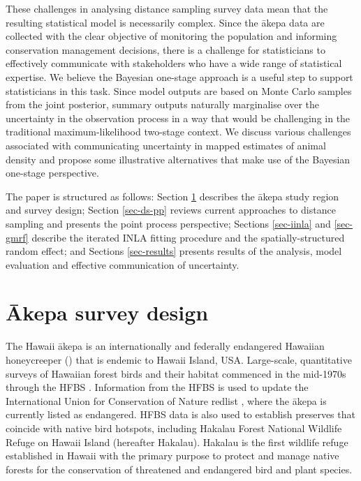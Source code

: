 \documentclass{statsoc}
\newcommand{\akepa}{\textquotesingle\={a}kepa}  %
\newcommand{\Akepa}{\textquotesingle\={A}kepa}  %
\newcommand{\hawaii}{Hawai\textquotesingle i}   %
\begin{document}
These challenges in analysing distance sampling survey data mean that the resulting statistical model is necessarily complex. Since the \akepa{} data are collected with the clear objective of monitoring the population and informing conservation management decisions, there is a challenge for statisticians to effectively communicate with stakeholders who have a wide range of statistical expertise. We believe the Bayesian one-stage approach is a useful step to support statisticians in this task.  Since model outputs are based on Monte Carlo samples from the joint posterior, summary outputs naturally marginalise over the uncertainty in the observation process in a way that would be challenging in the traditional maximum-likelihood two-stage context.  We discuss various challenges associated with communicating uncertainty in mapped estimates of animal density and propose some illustrative alternatives that make use of the Bayesian one-stage perspective.

The paper is structured as follows:  Section \ref{sec-study-design} describes the \akepa{} study region and survey design; Section \ref{sec-ds-pp} reviews current approaches to distance sampling and presents the point process perspective; Sections \ref{sec-iinla} and \ref{sec-gmrf} describe the iterated INLA fitting procedure and the spatially-structured random effect; and Sections \ref{sec-results} presents results of the analysis, model evaluation and effective communication of uncertainty.


\section{\Akepa{} survey design}
\label{sec-study-design}

The \hawaii{} \akepa{} is an internationally and federally endangered Hawaiian honeycreeper (\citealp{usfws_akepa_1970, birdlife_akepa_2016}) that is endemic to \hawaii{} Island, USA.  Large-scale, quantitative surveys of Hawaiian forest birds and their habitat commenced in the mid-1970s through the HFBS \citep{scott_HFBS_1986}. Information from the HFBS is used to update the International Union for Conservation of Nature redlist \citep{iucn_redlist_2022}, where the \akepa{} is currently listed as endangered. HFBS data is also used to establish preserves that coincide with native bird hotspots, including Hakalau Forest National Wildlife Refuge on \hawaii{} Island (hereafter Hakalau).  Hakalau is the first wildlife refuge established in \hawaii{} with the primary purpose to protect and manage native forests for the conservation of threatened and endangered bird and plant species.
\end{document}
